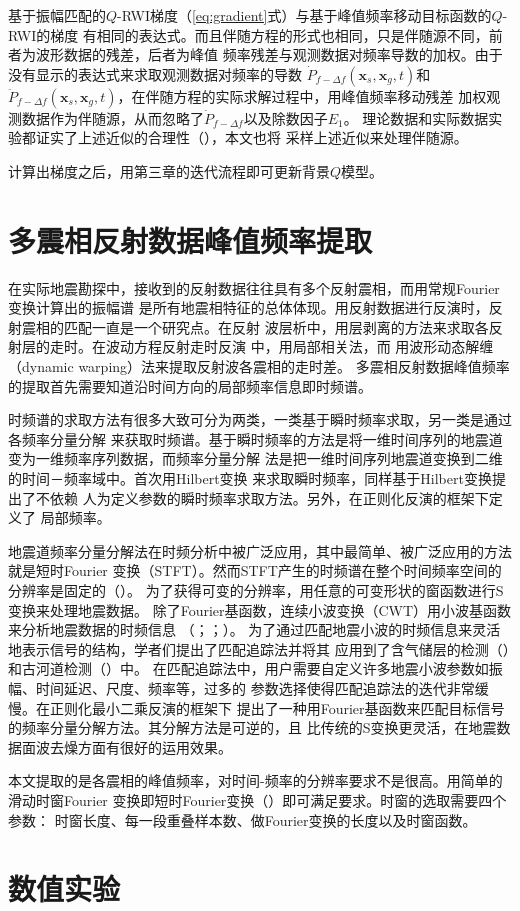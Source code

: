 基于振幅匹配的$Q$-RWI梯度（\ref{eq:gradient}式）与基于峰值频率移动目标函数的$Q$-RWI的梯度
有相同的表达式。而且伴随方程的形式也相同，只是伴随源不同，前者为波形数据的残差，后者为峰值
频率残差与观测数据对频率导数的加权。由于没有显示的表达式来求取观测数据对频率的导数
$\dot{P}_{f-\Delta f}(\mathbf{x}_s,\mathbf{x}_g,t)$和$\ddot{P}_{f-\Delta f}(\mathbf{x}_s,
\mathbf{x}_g,t)$，在伴随方程的实际求解过程中，用峰值频率移动残差
加权观测数据作为伴随源，从而忽略了$\dot{P}_{f-\Delta f}$以及除数因子$E_1$。
理论数据和实际数据实验都证实了上述近似的合理性（），本文也将
采样上述近似来处理伴随源。

计算出梯度之后，用第三章的迭代流程即可更新背景$Q$模型。


\vspace{0.5cm}
\section{多震相反射数据峰值频率提取}
\vspace{0.5cm}
在实际地震勘探中，接收到的反射数据往往具有多个反射震相，而用常规Fourier变换计算出的振幅谱
是所有地震相特征的总体体现。用反射数据进行反演时，反射震相的匹配一直是一个研究点。在反射
波层析中，用层剥离的方法来求取各反射层的走时。在波动方程反射走时反演
中，用局部相关法，而
用波形动态解缠（dynamic warping）法来提取反射波各震相的走时差。
多震相反射数据峰值频率的提取首先需要知道沿时间方向的局部频率信息即时频谱。

时频谱的求取方法有很多大致可分为两类，一类基于瞬时频率求取，另一类是通过各频率分量分解
来获取时频谱。基于瞬时频率的方法是将一维时间序列的地震道变为一维频率序列数据，而频率分量分解
法是把一维时间序列地震道变换到二维的时间－频率域中。首次用Hilbert变换
来求取瞬时频率，同样基于Hilbert变换提出了不依赖
人为定义参数的瞬时频率求取方法。另外，在正则化反演的框架下定义了
局部频率。

地震道频率分量分解法在时频分析中被广泛应用，其中最简单、被广泛应用的方法就是短时Fourier
变换（STFT）。然而STFT产生的时频谱在整个时间频率空间的分辨率是固定的（）。
为了获得可变的分辨率，用任意的可变形状的窗函数进行S变换来处理地震数据。
除了Fourier基函数，连续小波变换（CWT）用小波基函数来分析地震数据的时频信息
（；；）。
为了通过匹配地震小波的时频信息来灵活地表示信号的结构，学者们提出了匹配追踪法并将其
应用到了含气储层的检测（）和古河道检测（）中。
在匹配追踪法中，用户需要自定义许多地震小波参数如振幅、时间延迟、尺度、频率等，过多的
参数选择使得匹配追踪法的迭代非常缓慢。在正则化最小二乘反演的框架下
提出了一种用Fourier基函数来匹配目标信号的频率分量分解方法。其分解方法是可逆的，且
比传统的S变换更灵活，在地震数据面波去燥方面有很好的运用效果。

本文提取的是各震相的峰值频率，对时间-频率的分辨率要求不是很高。用简单的滑动时窗Fourier
变换即短时Fourier变换（）即可满足要求。时窗的选取需要四个参数：
时窗长度、每一段重叠样本数、做Fourier变换的长度以及时窗函数。




\vspace{0.5cm}
\section{数值实验}

